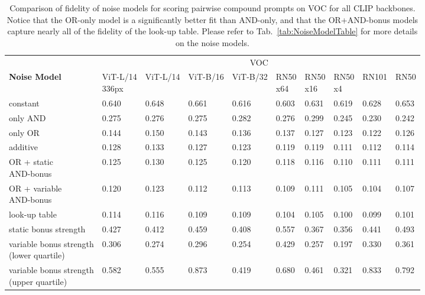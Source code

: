 \begin{table*}[ht]
\centering
\begin{tabular}{l|lllllllll}
\toprule
{} & \multicolumn{9}{c}{VOC} \\
\textbf{Noise Model} & \makecell{ViT-L/14 \\ 336px} & ViT-L/14 & ViT-B/16 & ViT-B/32 & \makecell{RN50 \\ x64} & \makecell{RN50 \\ x16} & \makecell{RN50 \\ x4} &  RN101 &   RN50 \\
\midrule
constant                  &        0.640 &   0.648 &   0.661 &   0.616 &   0.603 &   0.631 &  0.619 &  0.628 &  0.653 \\
\hline
only AND                     &        0.275 &   0.276 &   0.275 &   0.282 &   0.276 &   0.299 &  0.245 &  0.230 &  0.242 \\
\hline
only OR                      &        0.144 &   0.150 &   0.143 &   0.136 &   0.137 &   0.127 &  0.123 &  0.122 &  0.126 \\
\hline
additive                     &        0.128 &   0.133 &   0.127 &   0.123 &   0.119 &   0.119 &  0.111 &  0.112 &  0.114 \\
\hline
\makecell{OR + static \\ AND-bonus}            &        0.125 &   0.130 &   0.125 &   0.120 &   0.118 &   0.116 &  0.110 &  0.111 &  0.111 \\
\hline
\makecell{OR + variable \\ AND-bonus} &        0.120 &   0.123 &   0.112 &   0.113 &   0.109 &   0.111 &  0.105 &  0.104 &  0.107 \\
\hline
look-up table                 &        0.114 &   0.116 &   0.109 &   0.109 &   0.104 &   0.105 &  0.100 &  0.099 &  0.101 \\
\hline\hline
static bonus strength                        &        0.427 &   0.412 &   0.459 &   0.408 &   0.557 &   0.367 &  0.356 &  0.441 &  0.493 \\
\hline
\makecell{variable bonus strength \\ (lower quartile)}    &        0.306 &   0.274 &   0.296 &   0.254 &   0.429 &   0.257 &  0.197 &  0.330 &  0.361 \\
\hline
\makecell{variable bonus strength \\ (upper quartile)}    &        0.582 &   0.555 &   0.873 &   0.419 &   0.680 &   0.461 &  0.321 &  0.833 &  0.792 \\
\bottomrule
\end{tabular}
\caption{Comparison of fidelity of noise models for scoring pairwise compound prompts on VOC for all CLIP backbones. Notice that the OR-only model is a significantly better fit than AND-only, and that the OR+AND-bonus models capture nearly all of the fidelity of the look-up table. Please refer to Tab.~\ref{tab:NoiseModelTable} for more details on the noise models.}
\label{tab:NoiseModelExtendedVOC}
\end{table*}

